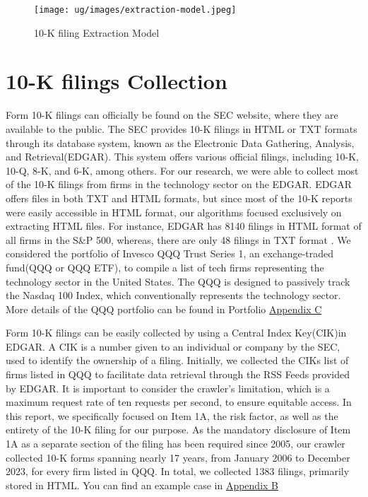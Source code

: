 \documentclass[logo,bsc,singlespacing,parskip]{infthesis}
\begin{document}
\begin{figure}[h!]
    \centering
    \texttt{[image: ug/images/extraction-model.jpeg]}
    \caption{10-K filing Extraction Model}
    \label{fig:extraction-model}
\end{figure}

\section{10-K filings Collection}
Form 10-K filings can officially be found on the SEC website, where they are available to the public. The SEC provides 10-K filings in HTML or TXT formats through its database system, known as the Electronic Data Gathering, Analysis, and Retrieval(EDGAR). This system offers various official filings, including 10-K, 10-Q, 8-K, and 6-K, among others. For our research, we were able to collect most of the 10-K filings from firms in the technology sector on the EDGAR. EDGAR offers files in both TXT and HTML formats, but since most of the 10-K reports were easily accessible in HTML format, our algorithms focused exclusively on extracting HTML files. For instance, EDGAR has 8140 filings in HTML format of all firms in the S\&P 500, whereas, there are only 48 filings in TXT format \cite{Sha2023}. We considered the portfolio of Invesco QQQ Trust Series 1, an exchange-traded fund(QQQ or QQQ ETF), to compile a list of tech firms representing the technology sector in the United States. The QQQ is designed to passively track the Nasdaq 100 Index, which conventionally represents the technology sector. More details of the QQQ portfolio can be found in Portfolio \hyperref[portfolio]{Appendix C} 

Form 10-K filings can be easily collected by using a Central Index Key(CIK)in EDGAR. A CIK is a number given to an individual or company by the SEC, used to identify the ownership of a filing. Initially, we collected the CIKs list of firms listed in QQQ to facilitate data retrieval through the RSS Feeds provided by EDGAR. It is important to consider the crawler’s limitation, which is a maximum request rate of ten requests per second, to ensure equitable access. In this report, we specifically focused on Item 1A, the risk factor, as well as the entirety of the 10-K filing for our purpose. As the mandatory disclosure of Item 1A as a separate section of the filing has been required since 2005, our crawler collected 10-K forms spanning nearly 17 years, from January 2006 to December 2023, for every firm listed in QQQ. In total, we collected 1383 filings, primarily stored in HTML. You can find an example case in \hyperref[appendix_nvidia_10-k]{Appendix B}
\end{document}
